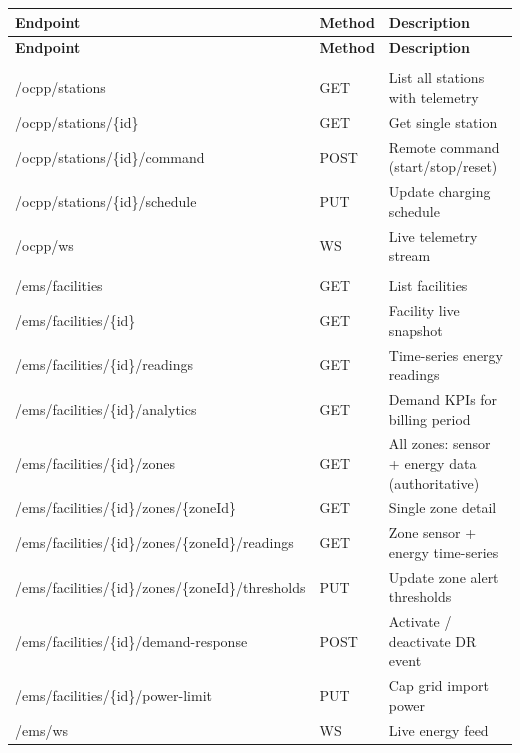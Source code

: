 \documentclass{article}
\begin{document}
\begin{longtable}{>{\ttfamily\footnotesize}p{} p{} p{}}
\toprule
\textbf{Endpoint} & \textbf{Method} & \textbf{Description}\\
\midrule
\endfirsthead
\toprule
\textbf{Endpoint} & \textbf{Method} & \textbf{Description}\\
\midrule
\endhead
\bottomrule
\endfoot

\multicolumn{3}{l}{\textit{OCPP Charging Monitoring}}\\[2pt]
/ocpp/stations                      & GET    & List all stations with telemetry\\
/ocpp/stations/\{id\}               & GET    & Get single station\\
/ocpp/stations/\{id\}/command       & POST   & Remote command (start/stop/reset)\\
/ocpp/stations/\{id\}/schedule      & PUT    & Update charging schedule\\
/ocpp/ws                            & WS     & Live telemetry stream\\[6pt]

\multicolumn{3}{l}{\textit{Energy Management System}}\\[2pt]
/ems/facilities                     & GET    & List facilities\\
/ems/facilities/\{id\}              & GET    & Facility live snapshot\\
/ems/facilities/\{id\}/readings     & GET    & Time-series energy readings\\
/ems/facilities/\{id\}/analytics    & GET    & Demand KPIs for billing period\\
/ems/facilities/\{id\}/zones               & GET  & All zones: sensor + energy data (authoritative)\\
/ems/facilities/\{id\}/zones/\{zoneId\}   & GET  & Single zone detail\\
/ems/facilities/\{id\}/zones/\{zoneId\}/readings & GET & Zone sensor + energy time-series\\
/ems/facilities/\{id\}/zones/\{zoneId\}/thresholds & PUT & Update zone alert thresholds\\
/ems/facilities/\{id\}/demand-response     & POST & Activate / deactivate DR event\\
/ems/facilities/\{id\}/power-limit         & PUT  & Cap grid import power\\
/ems/ws                                    & WS   & Live energy feed\\[6pt]


\end{longtable}
\end{document}

